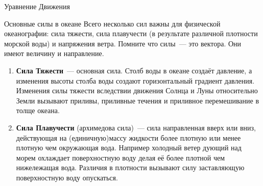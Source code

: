 \begin{chapter}{Уравнение Движения}
\begin{section}{Основные силы в океане}
Всего несколько сил важны для физической океанографии: сила тяжести,
сила плавучести (в результате различной плотности морской воды) и
напряжения ветра. Помните что силы~--- это вектора. Они имеют
величину и направление.
%
%
\begin{enumerate}
\item
\textbf{Сила Тяжести}~--- основная сила. Столб воды в океане создаёт
давление, а изменения высоты столба воды создают горизонтальный
градиент давления. Изменения силы тяжести вследствии движения Солнца и
Луны относительно Земли вызывают приливы, приливные течения и
приливное перемешивание в толще океана.
%

\item
\textbf{Сила Плавучести} (архимедова сила)~--- сила направленная вверх
или вниз, действующая на (единичную)массу жидкости более плотную или
менее плотную чем окружающая вода. Например холодный ветер дующий над
морем охлаждает поверхностную воду делая её более плотной чем
нижележащая вода. Различия в плотности вызывают силу заставляющую
поверхностную воду опускаться.
%

%


\end{enumerate}
\end{section}
\end{chapter}
